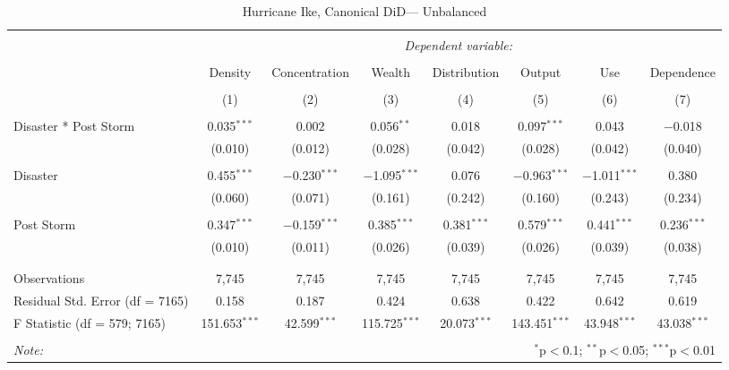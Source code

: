 
\begin{table}[!htbp] \centering 
  \caption{Hurricane Ike, Canonical DiD--- Unbalanced} 
  \label{} 
\footnotesize 
\begin{tabular}{@{\extracolsep{5pt}}lccccccc} 
\\[-1.8ex]\hline 
\hline \\[-1.8ex] 
 & \multicolumn{7}{c}{\textit{Dependent variable:}} \\ 
\cline{2-8} 
\\[-1.8ex] & Density & Concentration & Wealth & Distribution & Output & Use & Dependence \\ 
\\[-1.8ex] & (1) & (2) & (3) & (4) & (5) & (6) & (7)\\ 
\hline \\[-1.8ex] 
 Disaster * Post Storm & 0.035$^{***}$ & 0.002 & 0.056$^{**}$ & 0.018 & 0.097$^{***}$ & 0.043 & $-$0.018 \\ 
  & (0.010) & (0.012) & (0.028) & (0.042) & (0.028) & (0.042) & (0.040) \\ 
  & & & & & & & \\ 
 Disaster & 0.455$^{***}$ & $-$0.230$^{***}$ & $-$1.095$^{***}$ & 0.076 & $-$0.963$^{***}$ & $-$1.011$^{***}$ & 0.380 \\ 
  & (0.060) & (0.071) & (0.161) & (0.242) & (0.160) & (0.243) & (0.234) \\ 
  & & & & & & & \\ 
 Post Storm & 0.347$^{***}$ & $-$0.159$^{***}$ & 0.385$^{***}$ & 0.381$^{***}$ & 0.579$^{***}$ & 0.441$^{***}$ & 0.236$^{***}$ \\ 
  & (0.010) & (0.011) & (0.026) & (0.039) & (0.026) & (0.039) & (0.038) \\ 
  & & & & & & & \\ 
\hline \\[-1.8ex] 
Observations & 7,745 & 7,745 & 7,745 & 7,745 & 7,745 & 7,745 & 7,745 \\ 
Residual Std. Error (df = 7165) & 0.158 & 0.187 & 0.424 & 0.638 & 0.422 & 0.642 & 0.619 \\ 
F Statistic (df = 579; 7165) & 151.653$^{***}$ & 42.599$^{***}$ & 115.725$^{***}$ & 20.073$^{***}$ & 143.451$^{***}$ & 43.948$^{***}$ & 43.038$^{***}$ \\ 
\hline 
\hline \\[-1.8ex] 
\textit{Note:}  & \multicolumn{7}{r}{$^{*}$p$<$0.1; $^{**}$p$<$0.05; $^{***}$p$<$0.01} \\ 
\end{tabular} 
\end{table} 
